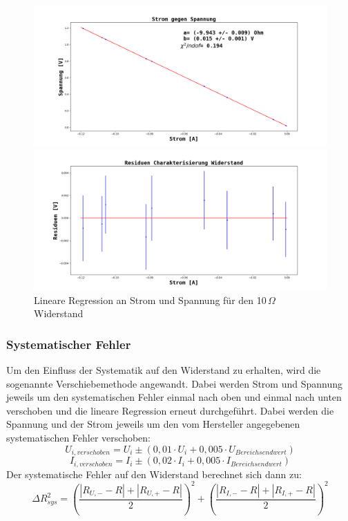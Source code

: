 \documentclass[12pt,a4paper]{article}
\begin{document}
\begin{figure}
\begin{center}
\includegraphics[scale=0.45]{Bilder/Widerstand_Fit_10.png}
\end{center}
\begin{center}
\includegraphics[scale=0.45]{Bilder/Charakterisierung_Widerstand10_Residuen.png}
\end{center}
\caption[Widerstand Lineare Regression]{Lineare Regression an Strom und Spannung für den 10$\, \Omega$ Widerstand}
\label{fig:Widerstand_lineare_Regression}
\end{figure}

\subsubsection{Systematischer Fehler}
Um den Einfluss der Systematik auf den Widerstand zu erhalten, wird die sogenannte Verschiebemethode angewandt. Dabei werden Strom und Spannung jeweils um den systematischen Fehler einmal nach oben und einmal nach unten verschoben und die lineare Regression erneut durchgeführt. Dabei werden die Spannung und der Strom jeweils um den vom Hersteller angegebenen systematischen Fehler verschoben:
\begin{equation}
U_{i, verschoben} = U_i \pm (0,01 \cdot U_i + 0,005 \cdot U_{Bereichsendwert})
\end{equation}
\begin{equation}
I_{i, verschoben} = I_i \pm (0,02 \cdot I_i + 0,005 \cdot I_{Bereichsendwert})
\end{equation}
Der systematische Fehler auf den Widerstand berechnet sich dann zu:
\begin{equation}
\Delta R_{sys}^2 = \left(\dfrac{|R_{U,-}-R| + |R_{U,+}-R|}{2}\right)^2 + \left(\dfrac{|R_{I,-}-R| + |R_{I,+}-R|}{2}\right)^2
\end{equation}
\end{document}
